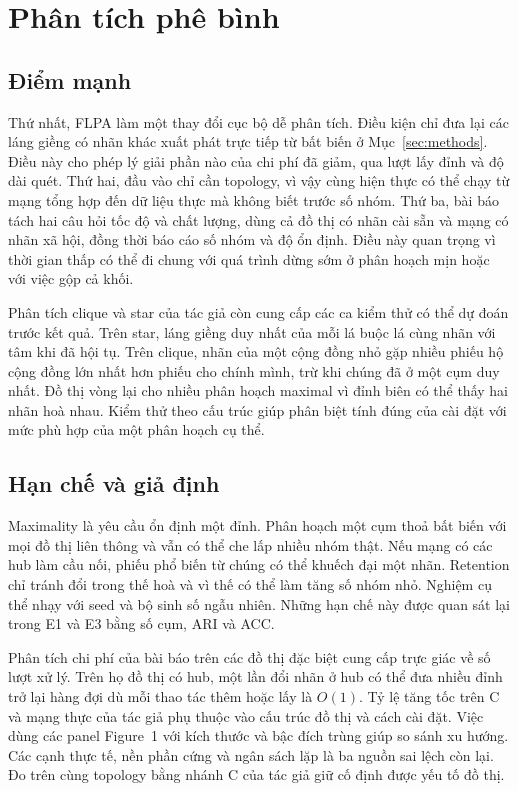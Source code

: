 \section{Phân tích phê bình}

\subsection{Điểm mạnh}
Thứ nhất, FLPA làm một thay đổi cục bộ dễ phân tích. Điều kiện chỉ đưa lại các láng giềng có nhãn khác xuất phát trực tiếp từ bất biến ở Mục~\ref{sec:methods}. Điều này cho phép lý giải phần nào của chi phí đã giảm, qua lượt lấy đỉnh và độ dài quét. Thứ hai, đầu vào chỉ cần topology, vì vậy cùng hiện thực có thể chạy từ mạng tổng hợp đến dữ liệu thực mà không biết trước số nhóm. Thứ ba, bài báo tách hai câu hỏi tốc độ và chất lượng, dùng cả đồ thị có nhãn cài sẵn và mạng có nhãn xã hội, đồng thời báo cáo số nhóm và độ ổn định. Điều này quan trọng vì thời gian thấp có thể đi chung với quá trình dừng sớm ở phân hoạch mịn hoặc với việc gộp cả khối.

Phân tích clique và star của tác giả còn cung cấp các ca kiểm thử có thể dự đoán trước kết quả. Trên star, láng giềng duy nhất của mỗi lá buộc lá cùng nhãn với tâm khi đã hội tụ. Trên clique, nhãn của một cộng đồng nhỏ gặp nhiều phiếu hộ cộng đồng lớn nhất hơn phiếu cho chính mình, trừ khi chúng đã ở một cụm duy nhất. Đồ thị vòng lại cho nhiều phân hoạch maximal vì đỉnh biên có thể thấy hai nhãn hoà nhau. Kiểm thử theo cấu trúc giúp phân biệt tính đúng của cài đặt với mức phù hợp của một phân hoạch cụ thể.

\subsection{Hạn chế và giả định}
Maximality là yêu cầu ổn định một đỉnh. Phân hoạch một cụm thoả bất biến với mọi đồ thị liên thông và vẫn có thể che lấp nhiều nhóm thật. Nếu mạng có các hub làm cầu nối, phiếu phổ biến từ chúng có thể khuếch đại một nhãn. Retention chỉ tránh đổi trong thế hoà và vì thế có thể làm tăng số nhóm nhỏ. Nghiệm cụ thể nhạy với seed và bộ sinh số ngẫu nhiên. Những hạn chế này được quan sát lại trong E1 và E3 bằng số cụm, ARI và ACC.

Phân tích chi phí của bài báo trên các đồ thị đặc biệt cung cấp trực giác về số lượt xử lý. Trên họ đồ thị có hub, một lần đổi nhãn ở hub có thể đưa nhiều đỉnh trở lại hàng đợi dù mỗi thao tác thêm hoặc lấy là $O(1)$. Tỷ lệ tăng tốc trên C và mạng thực của tác giả phụ thuộc vào cấu trúc đồ thị và cách cài đặt. Việc dùng các panel Figure~1 với kích thước và bậc đích trùng giúp so sánh xu hướng. Các cạnh thực tế, nền phần cứng và ngân sách lặp là ba nguồn sai lệch còn lại. Đo trên cùng topology bằng nhánh C của tác giả giữ cố định được yếu tố đồ thị.

